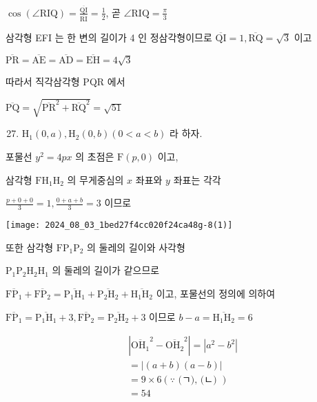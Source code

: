\documentclass[10pt]{article}
\begin{document}
\(\cos (\angle \mathrm{RIQ})=\frac{\overline{\mathrm{QI}}}{\overline{\mathrm{RI}}}=\frac{1}{2}\), 곧 \(\angle \mathrm{RIQ}=\frac{\pi}{3}\)

삼각형 EFI 는 한 변의 길이가 4 인 정삼각형이므로 \(\overline{\mathrm{QI}}=1, \overline{\mathrm{RQ}}=\sqrt{3}\) 이고

\(\overline{\mathrm{PR}}=\overline{\mathrm{AE}}=\overline{\mathrm{AD}}=\overline{\mathrm{EH}}=4 \sqrt{3}\)

따라서 직각삼각형 PQR 에서

\(\overline{\mathrm{PQ}}=\sqrt{\overline{\mathrm{PR}}^{2}+\overline{\mathrm{RQ}}^{2}}=\sqrt{51}\)

\begin{enumerate}
  \setcounter{enumi}{26}
  \item \(\mathrm{H}_{1}(0, a), \mathrm{H}_{2}(0, b)(0<a<b)\) 라 하자.
\end{enumerate}

포물선 \(y^{2}=4 p x\) 의 초점은 \(\mathrm{F}(p, 0)\) 이고,

삼각형 \(\mathrm{FH}_{1} \mathrm{H}_{2}\) 의 무게중심의 \(x\) 좌표와 \(y\) 좌표는 각각

\(\frac{p+0+0}{3}=1, \frac{0+a+b}{3}=3\) 이므로

\begin{center}
\texttt{[image: 2024\_08\_03\_1bed27f4cc020f24ca48g-8(1)]}
\end{center}

또한 삼각형 \(\mathrm{FP}_{1} \mathrm{P}_{2}\) 의 둘레의 길이와 사각형

\(\mathrm{P}_{1} \mathrm{P}_{2} \mathrm{H}_{2} \mathrm{H}_{1}\) 의 둘레의 길이가 같으므로

\(\overline{\mathrm{FP}_{1}}+\overline{\mathrm{FP}_{2}}=\overline{\mathrm{P}_{1} \mathrm{H}_{1}}+\overline{\mathrm{P}_{2} \mathrm{H}_{2}}+\overline{\mathrm{H}_{1} \mathrm{H}_{2}}\) 이고, 포물선의 정의에 의하여

\(\overline{\mathrm{FP}_{1}}=\overline{\mathrm{P}_{1} \mathrm{H}_{1}}+3, \overline{\mathrm{FP}_{2}}=\overline{\mathrm{P}_{2} \mathrm{H}_{2}}+3\) 이므로 \(b-a=\overline{\mathrm{H}_{1} \mathrm{H}_{2}}=6\)

\[
\begin{aligned}
& \left|{\overline{\mathrm{OH}_{1}}}^{2}-{\overline{\mathrm{OH}_{2}}}^{2}\right|=\left|a^{2}-b^{2}\right| \\
& =|(a+b)(a-b)| \\
& =9 \times 6(\because \text { (ㄱ), (ㄴ) }) \\
& =54
\end{aligned}
\]
\end{document}
